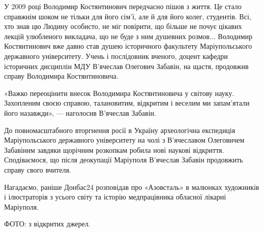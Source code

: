 У 2009 році Володимир Костянтинович передчасно пішов з життя. Це стало
справжнім шоком не тільки для його сім'ї, але й для його колег, студентів. Всі,
хто знав цю Людину особисто, не міг повірити, що більше не почує цікавих лекцій
улюбленого викладача, що не буде з ним душевних розмов... Володимир Костянтинович
вже давно став душею історичного факультету Маріупольського державного
університету. Учень і послідовник вченого, доцент кафедри історичних дисциплін
МДУ В'ячеслав Олегович Забавін, на щастя, продовжив справу Володимира
Костянтиновича.

«Важко переоцінити внесок Володимира Костянтиновича у світову науку.
Захопленим своєю справою, талановитим, відкритим і веселим ми запам'ятали його
назавжди», — наголосив В'ячеслав Забавін.

До повномасштабного вторгнення росії в Україну археологічна експедиція
Маріупольського державного університету на чолі з В'ячеславом Олеговичем
Забавіним завдяки щорічним розкопкам робила нові наукові відкриття.
Сподіваємося, що після деокупації Маріуполя В'ячеслав Забавін продовжить справу
свого вчителя.

Нагадаємо, раніше Донбас24 розповідав про «Азовсталь» в малюнках художників і
ілюстраторів з усього світу та історію медпрацівника обласної лікарні
Маріуполя.

ФОТО: з відкритих джерел.
